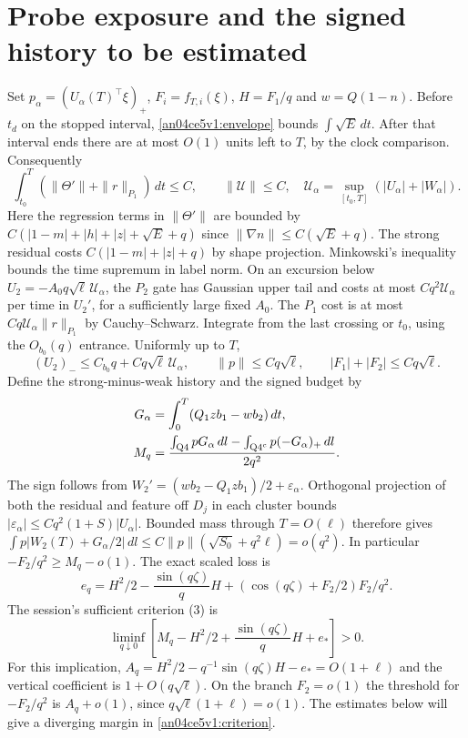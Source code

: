 \documentclass[11pt]{article}
\newcommand{\dd}{\,dl}
\newcommand{\dt}{\,dt}
\begin{document}
\section{Probe exposure and the signed history to be estimated}\label{an04ce5v1:history}
Set $p_\alpha=(U_\alpha(T)^\top\xi)_+$, $F_i=f_{T,i}(\xi)$, $H=F_1/q$ and $w=Q(1-n)$. Before $t_d$ on the stopped interval, \eqref{an04ce5v1:envelope} bounds $\int\sqrt E\dt$. After that interval ends there are at most $O(1)$ units left to $T$, by the clock comparison. Consequently
\[
 \int_{t_0}^T(\|\Theta'\|+\|r\|_{P_1})\dt\le C,\qquad
 \|\mathcal U\|\le C,\quad
 \mathcal U_\alpha=\sup_{[t_0,T]}(|U_\alpha|+|W_\alpha|).
\]
Here the regression terms in $\|\Theta'\|$ are bounded by $C(|1-m|+|h|+|z|+\sqrt E+q)$ since $\|\nabla n\|\le C(\sqrt E+q)$. The strong residual costs $C(|1-m|+|z|+q)$ by shape projection. Minkowski's inequality bounds the time supremum in label norm.
On an excursion below $U_2=-A_0q\sqrt\ell\,\mathcal U_\alpha$, the $P_2$ gate has Gaussian upper tail and costs at most $Cq^2\mathcal U_\alpha$ per time in $U_2'$, for a sufficiently large fixed $A_0$. The $P_1$ cost is at most $Cq\mathcal U_\alpha\|r\|_{P_1}$ by Cauchy--Schwarz. Integrate from the last crossing or $t_0$, using the $O_{b_0}(q)$ entrance. Uniformly up to $T$,
\[
 (U_2)_-\le C_{b_0}q+Cq\sqrt\ell\,\mathcal U_\alpha,\qquad
 \|p\|\le Cq\sqrt\ell,\qquad |F_1|+|F_2|\le Cq\sqrt\ell .
\]
Define the strong-minus-weak history and the signed budget by
\begin{align}
 G_\alpha&=\int_0^T (Q_1 z b_1-w b_2)\dt,\nonumber\\
 M_q&=\frac{\int_{\rm Q4}pG_\alpha\dd-\int_{{\rm Q4}^c}p(-G_\alpha)_+\dd}{2q^2}.
 \label{an04ce5v1:budget}
\end{align}
The sign follows from $W_2'=(w b_2-Q_1zb_1)/2+\varepsilon_\alpha$. Orthogonal projection of both the residual and feature off $D_j$ in each cluster bounds $|\varepsilon_\alpha|\le Cq^2(1+S)|U_\alpha|$. Bounded mass through $T=O(\ell)$ therefore gives
$\int p|W_2(T)+G_\alpha/2|\dd\le C\|p\|(\sqrt{S_0}+q^2\ell)=o(q^2)$.
In particular $-F_2/q^2\ge M_q-o(1)$. The exact scaled loss is
\[
 e_q=H^2/2-\frac{\sin(q\zeta)}q H+
 \left(\cos(q\zeta)+F_2/2\right)F_2/q^2 .
\]
The session's sufficient criterion (3) is
\begin{equation}\label{an04ce5v1:criterion}
 \liminf_{q\downarrow0}\left[M_q-H^2/2+\frac{\sin(q\zeta)}qH+e_*\right]>0 .
\end{equation}
For this implication, $A_q=H^2/2-q^{-1}\sin(q\zeta)H-e_*=O(1+\ell)$ and the vertical coefficient is $1+O(q\sqrt\ell)$. On the branch $F_2=o(1)$ the threshold for $-F_2/q^2$ is $A_q+o(1)$, since $q\sqrt\ell(1+\ell)=o(1)$. The estimates below will give a diverging margin in \eqref{an04ce5v1:criterion}.
\end{document}
